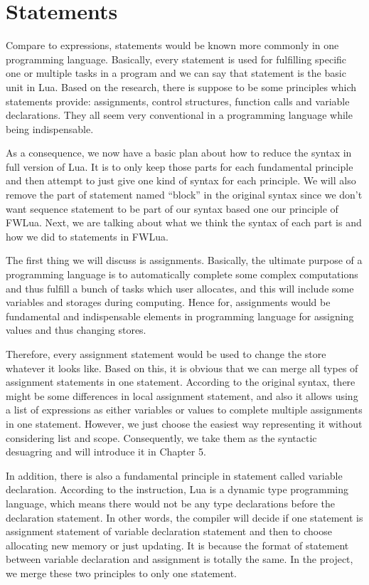 \section{Statements}
Compare to expressions, statements would be known more commonly in one programming language. Basically, every statement is used for fulfilling specific one or multiple tasks in a program and we can say that statement is the basic unit in Lua. Based on the research\cite{PIL}, there is suppose to be some principles which statements provide: assignments, control structures, function calls and variable declarations. They all seem very conventional in a programming language while being indispensable. 

As a consequence, we now have a basic plan about how to reduce the syntax in full version of Lua. It is to only keep those parts for each fundamental principle and then attempt to just give one kind of syntax for each principle. We will also remove the part of statement named ``block'' in the original syntax since we don't want sequence statement to be part of our syntax based one our principle of FWLua. Next, we are talking about what we think the syntax of each part is and how we did to statements in FWLua. 

The first thing we will discuss is assignments. Basically, the ultimate purpose of a programming language is to automatically complete some complex computations and thus fulfill a bunch of tasks which user allocates, and this will include some variables and storages during computing. Hence for, assignments would be fundamental and indispensable elements in programming language for assigning values and thus changing stores. 

Therefore, every assignment statement would be used to change the store whatever it looks like. Based on this, it is obvious that we can merge all types of assignment statements in one statement. According to the original syntax, there might be some differences in local assignment statement, and also it allows using a list of expressions as either variables or values to complete multiple assignments in one statement. However, we just choose the easiest way representing it without considering list and scope. Consequently, we take them as the syntactic desuagring and will introduce it in Chapter 5.

In addition, there is also a fundamental principle in statement called variable declaration. According to the instruction, Lua is a dynamic\cite{LTC} type programming language, which means there would not be any type declarations before the declaration statement. In other words, the compiler will decide if one statement is assignment statement of variable declaration statement and then to choose allocating new memory or just updating. It is because the format of statement between variable declaration and assignment is totally the same. In the project, we merge these two principles to only one statement.

